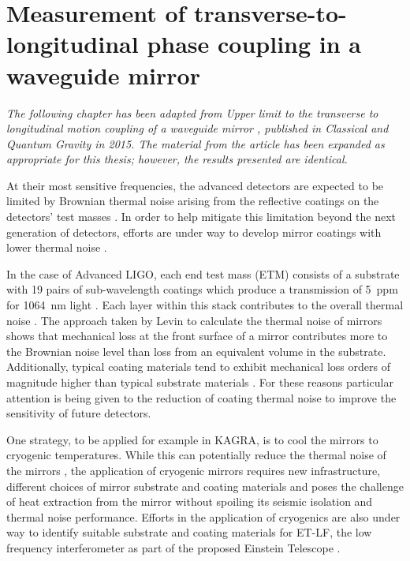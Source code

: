 \chapter{Measurement of transverse-to-longitudinal phase coupling in a waveguide mirror}
\label{c:waveguides}

\emph{The following chapter has been adapted from \emph{Upper limit to the transverse to longitudinal motion coupling of a waveguide mirror \cite{Leavey2015}}, published in \emph{Classical and Quantum Gravity} in 2015. The material from the article has been expanded as appropriate for this thesis; however, the results presented are identical.}

At their most sensitive frequencies, the advanced detectors  are expected to be limited by Brownian thermal noise arising from the reflective coatings on the detectors' test masses \cite{Levin1998, Nakagawa2002, Harry2002, Crooks2002}. In order to help mitigate this limitation beyond the next generation of detectors, efforts are under way to develop mirror coatings with lower thermal noise \cite{Flaminio2010, Bassiri2013}.

In the case of Advanced LIGO, each end test mass (\gls{ETM}) consists of a substrate with 19 pairs of sub-wavelength coatings which produce a transmission of \SI{5}{ppm} for \SI{1064}{\nano\meter} light \cite{Dannenberg2009}. Each layer within this stack contributes to the overall thermal noise \cite{Harry2002, Crooks2002}. The approach taken by Levin to calculate the thermal noise of mirrors \cite{Levin1998} shows that mechanical loss at the front surface of a mirror contributes more to the Brownian noise level than loss from an equivalent volume in the substrate. Additionally, typical coating materials tend to exhibit mechanical loss orders of magnitude higher than typical substrate materials \cite{Harry2002, Crooks2002}. For these reasons particular attention is being given to the reduction of coating thermal noise to improve the sensitivity of future detectors.

One strategy, to be applied for example in KAGRA, is to cool the mirrors to cryogenic temperatures. While this can potentially reduce the thermal noise of the mirrors \cite{Uchiyama2012}, the application of cryogenic mirrors requires new infrastructure, different choices of mirror substrate and coating materials and poses the challenge of heat extraction from the mirror without spoiling its seismic isolation and thermal noise performance. Efforts in the application of cryogenics are also under way to identify suitable substrate and coating materials for ET-LF, the low frequency interferometer as part of the proposed Einstein Telescope \cite{Punturo2010, Martin2010, Hild2011, Abernathy2011}.

